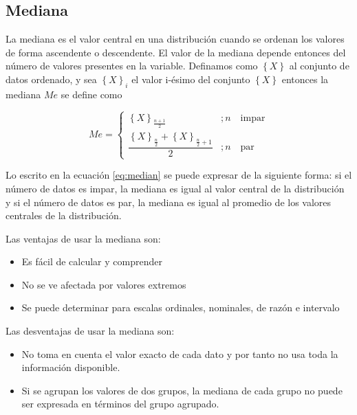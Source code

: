 \documentclass[]{book}
\providecommand{\tightlist}{%
  \setlength{\itemsep}{0pt}\setlength{\parskip}{0pt}}
\begin{document}
\hypertarget{mediana}{%
\subsection{Mediana}\label{mediana}}

La mediana es el valor central en una distribución cuando se ordenan los valores de forma ascendente o descendente. El valor de la mediana depende entonces del número de valores presentes en la variable. Definamos como \(\left\{ X \right \}\) al conjunto de datos ordenado, y sea \(\left \{ X \right \}_i\) el valor i-ésimo del conjunto \(\left \{ X \right \}\) entonces la mediana \(Me\) se define como

\begin{equation}
Me = \begin{cases} 
      \left \{ X \right\}_{\frac{n+1}{2}} & ; n \quad \textrm{impar}  \\
      \dfrac{\left \{ X  \right \}_{\frac{n}{2}} + \left \{ X  \right \}_{\frac{n}{2}+1} }{2} & ; n \quad \textrm{par}
   \end{cases}
   \label{eq:median}
\end{equation}

Lo escrito en la ecuación \eqref{eq:median} se puede expresar de la siguiente forma: si el número de datos es impar, la mediana es igual al valor central de la distribución y si el número de datos es par, la mediana es igual al promedio de los valores centrales de la distribución.

Las ventajas de usar la mediana son:

\begin{itemize}
\tightlist
\item
  Es fácil de calcular y comprender
\item
  No se ve afectada por valores extremos
\item
  Se puede determinar para escalas ordinales, nominales, de razón e intervalo
\end{itemize}

Las desventajas de usar la mediana son:

\begin{itemize}
\tightlist
\item
  No toma en cuenta el valor exacto de cada dato y por tanto no usa toda la información disponible.
\item
  Si se agrupan los valores de dos grupos, la mediana de cada grupo no puede ser expresada en términos del grupo agrupado.
\end{itemize}
\end{document}
